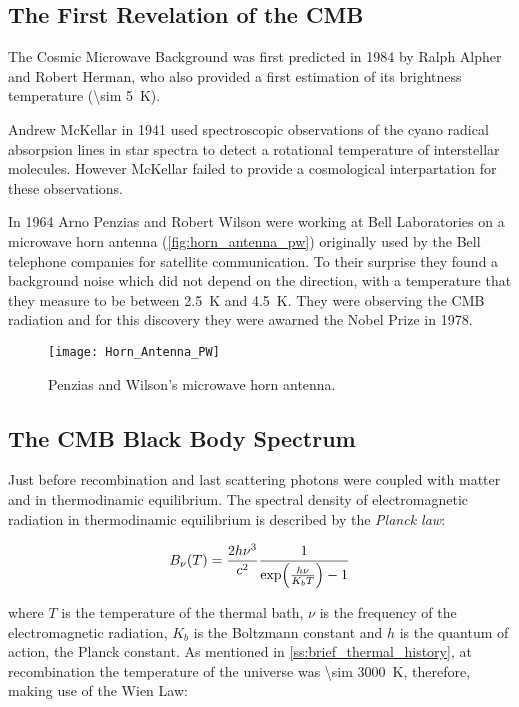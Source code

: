 \subsection{The First Revelation of the CMB}

The Cosmic Microwave Background was first predicted in 1984 by Ralph Alpher
and Robert Herman, who also provided a first estimation of its brightness
temperature (\SI{\sim 5}{\kelvin}).

Andrew McKellar in 1941 used spectroscopic observations of the cyano radical
absorpsion lines in star spectra to detect a rotational temperature of
interstellar molecules. However McKellar failed to provide a cosmological
interpartation for these observations.

In 1964 Arno Penzias and Robert Wilson were working at Bell Laboratories
on a microwave horn antenna (\autoref{fig:horn_antenna_pw}) originally used by
the Bell telephone companies for satellite communication.
To their surprise they found a background noise which did not depend on the
direction, with a temperature that they measure to be between
\SI{2.5}{\kelvin} and \SI{4.5}{\kelvin}. They were observing the CMB
radiation and for this discovery they were awarned the Nobel Prize in 1978.

\begin{figure}
        \centering
        \texttt{[image: Horn\_Antenna\_PW]}
        \caption{Penzias and Wilson's microwave horn antenna.}
        \label{fig:horn_antenna_pw}
\end{figure}

\subsection{The CMB Black Body Spectrum}

Just before recombination and last scattering photons were
coupled with matter and in thermodinamic equilibrium. The spectral density
of electromagnetic radiation in thermodinamic equilibrium is described by
the \emph{Planck law}:

\begin{equation}
        B_\nu\qty(T) = \frac{2h\nu^3}{c^2}
        \frac{1}{\exp(\frac{h\nu}{K_b T}) - 1}
\end{equation}

where $T$ is the temperature of the thermal bath, $\nu$ is the frequency of
the electromagnetic radiation, $K_b$ is the Boltzmann constant and $h$ is
the quantum of action, the Planck constant. As mentioned in
\autoref{ss:brief_thermal_history}, at recombination the temperature of the
universe was \SI{\sim 3000}{\kelvin}, therefore, making use of the Wien
Law:

